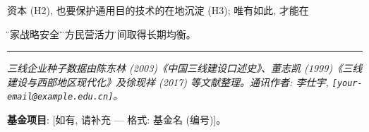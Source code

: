 资本 (H2), 也要保护通用目的技术的在地沉淀 (H3); 唯有如此, 才能在

\"国家战略安全\"与\"地方民营活力\"之间取得长期均衡。



\vspace{1em}\hrule\vspace{1em}



\begin{center}

\small

\textit{三线企业种子数据由陈东林 (2003)《中国三线建设口述史》、董志凯 (1999)《三线建设与西部地区现代化》及徐现祥 (2017) 等文献整理。通讯作者: 李仕宇, \texttt{[your-email@example.edu.cn]}。}


\textbf{基金项目}: [如有, 请补充 --- 格式: 基金名 (编号)]。

\end{center}






